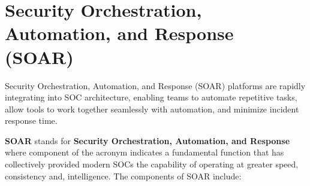 \chapter{Security Orchestration, Automation, and Response (SOAR)}

Security Orchestration, Automation, and Response (SOAR) platforms are rapidly integrating into SOC architecture, enabling teams to automate repetitive tasks, allow tools to work together seamlessly with automation, and minimize incident response time.

\textbf{SOAR} stands for \textbf{Security Orchestration, Automation, and Response} where component of the acronym indicates a fundamental function that has collectively provided modern SOCs the capability of operating at greater speed, consistency and, intelligence. The components of SOAR include: 

